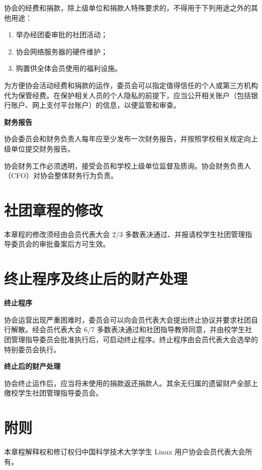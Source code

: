 	协会的经费和捐款，除上级单位和捐款人特殊要求的，不得用于下列用途之外的其他用途：
	
	\begin{enumerate}
		\item 举办经团委审批的社团活动；
		\item 协会网络服务器的硬件维护；
		\item 购置供全体会员使用的福利设施。
	\end{enumerate}
	
	为方便协会活动经费和捐款的运作，委员会可以指定值得信任的个人或第三方机构代为保管经费。在保护相关人员的个人隐私的前提下，应当公开相关账户（包括银行账户、网上支付平台账户）的信息，以便监管和审查。
	
	\term \textbf{财务报告}
	
	协会委员会和财务负责人每年应至少发布一次财务报告，并按照学校相关规定向上级单位提交财务报告。
	
	协会财务工作必须透明，接受会员和学校上级单位监督及质询。协会财务负责人（CFO）对协会整体财务行为负责。
	
	\section{社团章程的修改}
	
	\term 本章程的修改须经由会员代表大会 2/3 多数表决通过、并报请校学生社团管理指导委员会的审批备案后方可生效。
	
	\section{终止程序及终止后的财产处理}
	
	\term \textbf{终止程序}
	
	协会运营出现严重困难时，委员会可以向会员代表大会提出终止协议并要求社团自行解散。经会员代表大会 6/7 多数表决通过和社团指导教师同意，并由校学生社团管理指导委员会批准执行后，可启动终止程序。终止程序由会员代表大会选举的特别委员会执行。
	
	\term \textbf{终止后的财产处理}
	
	协会终止运作后，应当将未使用的捐款返还捐款人。其余无归属的遗留财产全部上缴校学生社团管理指导委员会。
	
	\section{附则}
	
	\term 本章程解释权和修订权归中国科学技术大学学生 Linux 用户协会会员代表大会所有。
	
